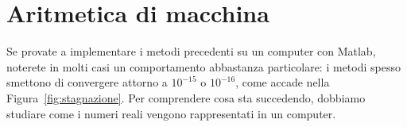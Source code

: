 \documentclass[a4paper]{report}
\DeclarePairedDelimiter{\abs}{\lvert}{\rvert}
\theoremstyle{definiton}
\theoremstyle{remark}
\begin{document}

\chapter{Aritmetica di macchina}

Se provate a implementare i metodi precedenti su un computer con Matlab, noterete in molti casi un comportamento abbastanza particolare: i metodi spesso smettono di convergere attorno a $10^{-15}$ o $10^{-16}$, come accade nella Figura~\ref{fig:stagnazione}. Per comprendere cosa sta succedendo, dobbiamo studiare come i numeri reali vengono rappresentati in un computer.
\end{document}
